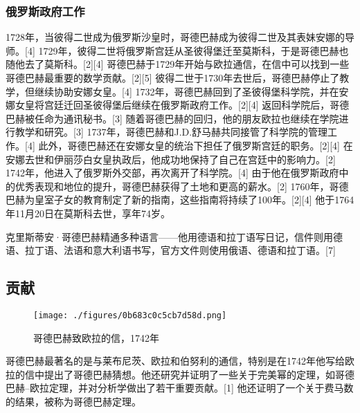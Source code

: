 \subsubsection{俄罗斯政府工作} 
1728年，当彼得二世成为俄罗斯沙皇时，哥德巴赫成为彼得二世及其表妹安娜的导师。[4] 1729年，彼得二世将俄罗斯宫廷从圣彼得堡迁至莫斯科，于是哥德巴赫也随他去了莫斯科。[2][4] 哥德巴赫于1729年开始与欧拉通信，在信中可以找到一些哥德巴赫最重要的数学贡献。[2][5] 彼得二世于1730年去世后，哥德巴赫停止了教学，但继续协助安娜女皇。[4] 1732年，哥德巴赫回到了圣彼得堡科学院，并在安娜女皇将宫廷迁回圣彼得堡后继续在俄罗斯政府工作。[2][4] 返回科学院后，哥德巴赫被任命为通讯秘书。[3] 随着哥德巴赫的回归，他的朋友欧拉也继续在学院进行教学和研究。[3] 1737年，哥德巴赫和J.D.舒马赫共同接管了科学院的管理工作。[4] 此外，哥德巴赫还在安娜女皇的统治下担任了俄罗斯宫廷的职务。[2][4] 在安娜去世和伊丽莎白女皇执政后，他成功地保持了自己在宫廷中的影响力。[2] 1742年，他进入了俄罗斯外交部，再次离开了科学院。[4] 由于他在俄罗斯政府中的优秀表现和地位的提升，哥德巴赫获得了土地和更高的薪水。[2] 1760年，哥德巴赫为皇室子女的教育制定了新的指南，这些指南将持续了100年。[2][4] 他于1764年11月20日在莫斯科去世，享年74岁。

克里斯蒂安·哥德巴赫精通多种语言——他用德语和拉丁语写日记，信件则用德语、拉丁语、法语和意大利语书写，官方文件则使用俄语、德语和拉丁语。[7]
\subsection{贡献}
\begin{figure}[ht]
\centering
\texttt{[image: ./figures/0b683c0c5cb7d58d.png]}
\caption{哥德巴赫致欧拉的信，1742年} \label{fig_Goldba_2}
\end{figure}
哥德巴赫最著名的是与莱布尼茨、欧拉和伯努利的通信，特别是在1742年他写给欧拉的信中提出了哥德巴赫猜想。他还研究并证明了一些关于完美幂的定理，如哥德巴赫–欧拉定理，并对分析学做出了若干重要贡献。[1] 他还证明了一个关于费马数的结果，被称为哥德巴赫定理。
